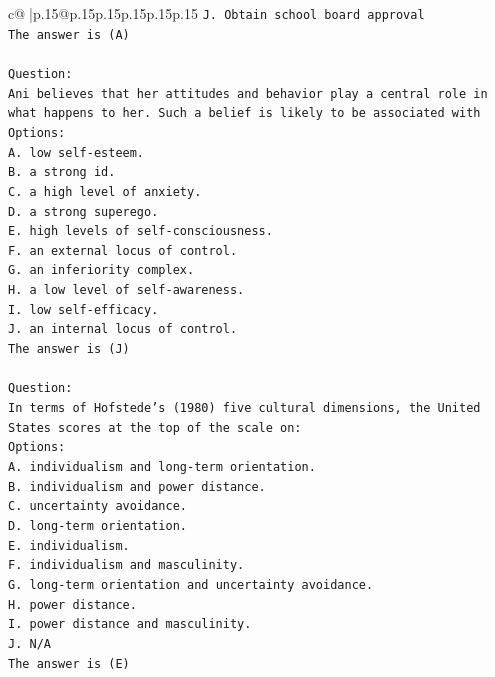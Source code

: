 \documentclass{article}
\begin{document}
{\begin{supertabular}{c@{$\;$}|p{.15\linewidth}@{}p{.15\linewidth}p{.15\linewidth}p{.15\linewidth}p{.15\linewidth}p{.15\linewidth}}
{{{\texttt{J. Obtain school board approval} \\
\texttt{The answer is (A)} \\
\\ 
\texttt{Question:} \\
\texttt{Ani believes that her attitudes and behavior play a central role in what happens to her. Such a belief is likely to be associated with} \\
\texttt{Options:} \\
\texttt{A. low self{-}esteem.} \\
\texttt{B. a strong id.} \\
\texttt{C. a high level of anxiety.} \\
\texttt{D. a strong superego.} \\
\texttt{E. high levels of self{-}consciousness.} \\
\texttt{F. an external locus of control.} \\
\texttt{G. an inferiority complex.} \\
\texttt{H. a low level of self{-}awareness.} \\
\texttt{I. low self{-}efficacy.} \\
\texttt{J. an internal locus of control.} \\
\texttt{The answer is (J)} \\
\\ 
\texttt{Question:} \\
\texttt{In terms of Hofstede’s (1980) five cultural dimensions, the United States scores at the top of the scale on:} \\
\texttt{Options:} \\
\texttt{A. individualism and long{-}term orientation.} \\
\texttt{B. individualism and power distance.} \\
\texttt{C. uncertainty avoidance.} \\
\texttt{D. long{-}term orientation.} \\
\texttt{E. individualism.} \\
\texttt{F. individualism and masculinity.} \\
\texttt{G. long{-}term orientation and uncertainty avoidance.} \\
\texttt{H. power distance.} \\
\texttt{I. power distance and masculinity.} \\
\texttt{J. N/A} \\
\texttt{The answer is (E)} \\
}}}
\end{supertabular}}
\end{document}
